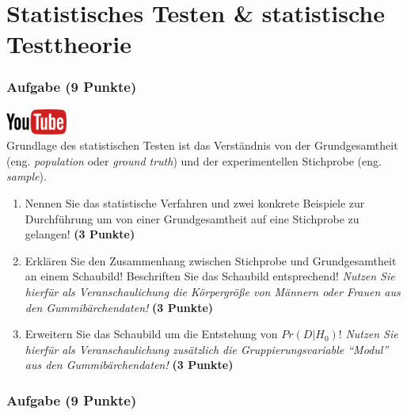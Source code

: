 \documentclass[a4paper, 9pt]{scrartcl}\usepackage[]{graphicx}\usepackage[]{xcolor}
\begin{document}
 
\clearpage
\part{Statistisches Testen \& statistische Testtheorie}

\section{Aufgabe \hfill (9 Punkte)}

\hfill\href{https://youtu.be/aHVYuFKTqZs}{\includegraphics[width =
  2cm]{img/youtube}}\\[1Ex]

Grundlage des statistischen Testen ist das Verst{\"a}ndnis von der
Grundgesamtheit (eng. \textit{population} oder \textit{ground truth}) und
der experimentellen Stichprobe (eng. \textit{sample}). 

\begin{enumerate}
\item Nennen Sie das statistische Verfahren und zwei konkrete Beispiele zur
  Durchf{\"u}hrung um von einer Grundgesamtheit auf eine Stichprobe zu
  gelangen! \textbf{(3 Punkte)}
\item Erkl{\"a}ren Sie den Zusammenhang zwischen Stichprobe und Grundgesamtheit
  an einem Schaubild! Beschriften Sie das Schaubild entsprechend!
  \textit{Nutzen Sie hierf{\"u}r als Veranschaulichung die K{\"o}rpergr{\"o}{\ss}e von
    M{\"a}nnern oder Frauen aus den Gummib{\"a}rchendaten!}  \textbf{(3 Punkte)}
\item Erweitern Sie das Schaubild um die Entstehung von $Pr(D|H_0)$!
  \textit{Nutzen Sie hierf{\"u}r als Veranschaulichung zus{\"a}tzlich die
    Gruppierungsvariable "`Modul"' aus den Gummib{\"a}rchendaten!}  \textbf{(3
    Punkte)}
\end{enumerate} 
\clearpage

\section{Aufgabe \hfill (9 Punkte)}
\end{document}
